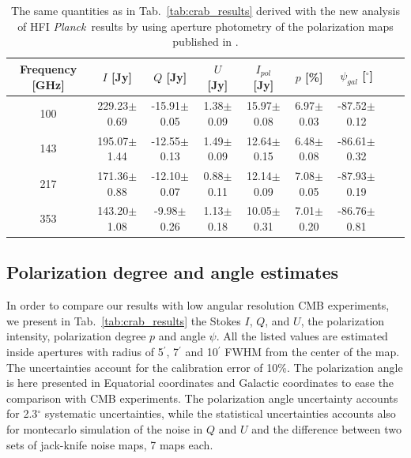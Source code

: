 \documentclass[twocolumn,traditabstract]{aa}
\def\Planck{\textit{Planck}}
\begin{document}
 \begin{table}[h!]
  \centering
      \begin{tabular}{ccccccccc}
      \hline
      \hline
       Frequency [GHz] & \small $I$ [Jy] & \small $Q$ [Jy] & \small $U$ [Jy] & \small $I_{pol}$ [Jy] & \small $p$ [\%] & \small $\psi_{gal}$ [$^\circ$] \\
      \hline

\small 100 & \small 229.23$\pm$0.69  & \small -15.91$\pm$0.05 & \small 1.38$\pm$0.09 & \small 15.97$\pm$0.08 & \small 6.97$\pm$0.03 & \small -87.52$\pm$0.12  \\ 
\small 143 & \small 195.07$\pm$1.44  & \small -12.55$\pm$0.13 & \small 1.49$\pm$0.09 & \small 12.64$\pm$0.15 & \small 6.48$\pm$0.08 & \small -86.61$\pm$0.32  \\
\small 217 & \small 171.36$\pm$0.88  & \small -12.10$\pm$0.07 & \small 0.88$\pm$0.11 & \small 12.14$\pm$0.09 & \small 
7.08$\pm$0.05 & \small -87.93$\pm$0.19  \\
\small 353 & \small 143.20$\pm$1.08  & \small -9.98$\pm$0.26 & \small 1.13$\pm$0.18 & \small 10.05$\pm$0.31 & \small 7.01$\pm$0.20 & \small -86.76$\pm$0.81 \\
    \hline            
    \hline   
    \end{tabular}
   \caption{The same quantities as in Tab.~\ref{tab:crab_results} derived with the new analysis of HFI \Planck\ results by using aperture photometry of the polarization maps published in \cite{refId0}.}
    \label{tab:planck_results}
 \end{table}

\subsection{Polarization degree and angle estimates}
In order to compare our results with low angular resolution CMB experiments, we present in Tab.~\ref{tab:crab_results} the Stokes $I$, $Q$, and $U$, the polarization intensity, polarization degree $p$ and angle $\psi$. All the listed values are estimated inside apertures with radius of 5$^\prime$, 7$^\prime$ and 10$^\prime$ FWHM from the center of the map. The uncertainties account for the calibration error of 10\%. 
The polarization angle is here presented in Equatorial coordinates and Galactic coordinates to ease the comparison with CMB experiments.
The polarization angle uncertainty accounts for 2.3$^{\circ}$ systematic uncertainties, while the statistical uncertainties accounts also for montecarlo simulation of the noise in $Q$ and $U$ and the difference between two sets of jack-knife noise maps, 7 maps each.
\end{document}
